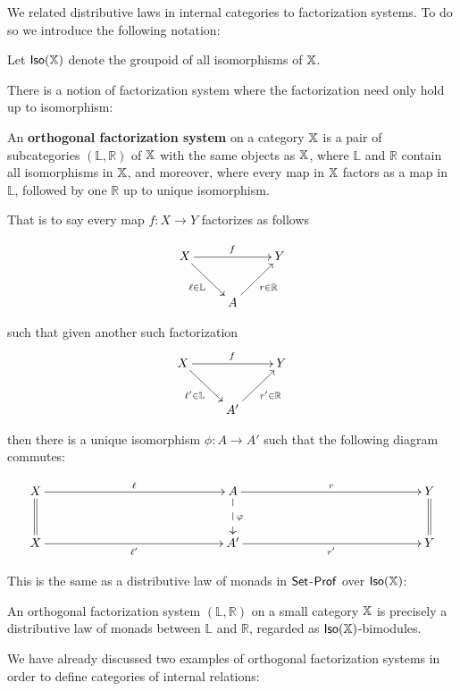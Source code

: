 We related distributive laws in internal categories to factorization systems.  To do so we introduce the following notation:

\begin{definition}
Let ${\sf Iso}(\mathbb{X})$ denote the groupoid  of all isomorphisms of $\mathbb{X}$.
\end{definition}

There is a notion of factorization system where the factorization need only hold up to isomorphism:
\begin{definition}
An {\bf orthogonal factorization system} on a category $\mathbb{X}$ is a pair of subcategories $(\mathbb{L},\mathbb{R})$ of $\mathbb{X}$ with the same objects as $\mathbb{X}$, where $\mathbb{L}$ and $\mathbb{R}$ contain all isomorphisms in $\mathbb{X}$, and moreover, where every map in $\mathbb{X}$ factors as a map in  $\mathbb{L}$, followed by one $\mathbb{R}$ up to unique isomorphism.


That is to say every map $f:X\to Y$ factorizes as follows


$$
\xymatrix{
X  \ar[rr]^{f} \ar[dr]_{\ell \in {\mathbb L}} &       & Y\\
   & A \ar[ur]_{r \in {\mathbb R}}
}
$$

such that given another such factorization
$$
\xymatrix{
X  \ar[rr]^{f} \ar[dr]_{\ell' \in {\mathbb L}} &       & Y\\
   & A' \ar[ur]_{r' \in {\mathbb R}}
}
$$

then there is a unique isomorphism $\phi:A\to A'$ such that the following diagram commutes:

$$
\xymatrixrowsep{10mm}
\xymatrixcolsep{50mm}
\xymatrix{
X \ar@{=}[d] \ar[r]^{\ell}   & A  \ar@{-->}[d]^{\phi} \ar[r]^{r} & Y \ar@{=}[d]\\
X   \ar[r]_{\ell'}                & A' \ar[r]_{r'} & Y
}
$$

\end{definition}

This is the same as a distributive law of monads in $\mathsf{Set}$-${\sf Prof}$ over ${\sf Iso}(\mathbb{X})$:

\begin{lemma}
An orthogonal factorization system $(\mathbb{L},\mathbb{R})$ on a small category $\mathbb{X}$ is precisely a distributive law of monads between $\mathbb{L}$ and $\mathbb{R}$, regarded as ${\sf Iso}(\mathbb{X})$-bimodules.
\end{lemma}

We have already discussed two examples of orthogonal factorization systems in order to define categories of internal relations:

